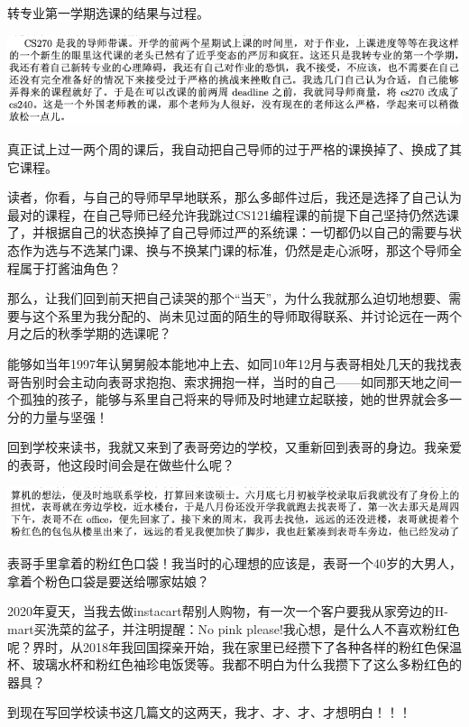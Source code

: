 \documentclass[9pt, b5paper]{article}
\begin{document}
转专业第一学期选课的结果与过程。

\begin{center}
\includegraphics[width=.9\linewidth]{./pic/backups_plans_20210421_141921.png}
\end{center}

真正试上过一两个周的课后，我自动把自己导师的过于严格的课换掉了、换成了其它课程。

读者，你看，与自己的导师早早地联系，那么多邮件过后，我还是选择了自己认为最对的课程，在自己导师已经允许我跳过CS121编程课的前提下自己坚持仍然选课了，并根据自己的状态换掉了自己导师过严的系统课：一切都仍以自己的需要与状态作为选与不选某门课、换与不换某门课的标准，仍然是走心派呀，那这个导师全程属于打酱油角色？

那么，让我们回到前天把自己读哭的那个“当天”，为什么我就那么迫切地想要、需要与这个系里为我分配的、尚未见过面的陌生的导师取得联系、并讨论远在一两个月之后的秋季学期的选课呢？

能够如当年1997年认舅舅般本能地冲上去、如同10年12月与表哥相处几天的我找表哥告别时会主动向表哥求抱抱、索求拥抱一样，当时的自己——如同那天地之间一个孤独的孩子，能够与系里自己将来的导师及时地建立起联接，她的世界就会多一分的力量与坚强！

回到学校来读书，我就又来到了表哥旁边的学校，又重新回到表哥的身边。我亲爱的表哥，他这段时间会是在做些什么呢？


\begin{center}
\includegraphics[width=.9\linewidth]{./pic/backups_plans_20210421_142818.png}
\end{center}

表哥手里拿着的粉红色口袋！我当时的心理想的应该是，表哥一个40岁的大男人，拿着个粉色口袋是要送给哪家姑娘？

2020年夏天，当我去做instacart帮别人购物，有一次一个客户要我从家旁边的H-mart买洗菜的盆子，并注明提醒：No pink please!我心想，是什么人不喜欢粉红色呢？界时，从2018年我回国探亲开始，我在家里已经攒下了各种各样的粉红色保温杯、玻璃水杯和粉红色袖珍电饭煲等。我都不明白为什么我攒下了这么多粉红色的器具？

到现在写回学校读书这几篇文的这两天，我才、才、才、才想明白！！！
\end{document}
